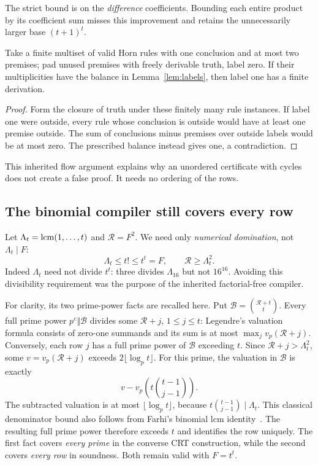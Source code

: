 The strict bound is on the \emph{difference} coefficients. Bounding
each entire product by its coefficient sum misses this improvement
and retains the unnecessarily larger base $(t+1)^t$.

\begin{lemma}
Take a finite multiset of valid Horn rules with one conclusion and at most
two premises; pad unused premises with freely derivable truth, label zero.
If their multiplicities have the balance in Lemma~\ref{lem:labels},
then label one has a finite derivation.
\end{lemma}
\begin{proof}
Form the closure of truth under these finitely many rule instances.
If label one were outside, every rule whose conclusion is outside would
have at least one premise outside. The sum of conclusions minus premises
over outside labels would be at most zero. The prescribed balance
instead gives one, a contradiction.
\end{proof}

This inherited flow argument explains why an unordered certificate with
cycles does not create a false proof. It needs no ordering of the rows.

\subsection{The binomial compiler still covers every row}

Let $\Lambda_t=\operatorname{lcm}(1,\ldots,t)$ and $\mathcal R=F^2$. We need only
\emph{numerical domination}, not $\Lambda_t\mid F$:
\[
 \Lambda_t\le t!\le t^t=F,\qquad \mathcal R\ge\Lambda_t^2.
\]
Indeed $\Lambda_t$ need not divide $t^t$: three divides $\Lambda_{16}$
but not $16^{16}$. Avoiding this divisibility requirement was the
purpose of the inherited factorial-free compiler.

For clarity, its two prime-power facts are recalled here. Put
$\mathcal B=\binom{\mathcal R+t}{t}$. Every full prime power
$p^e\Vert\mathcal B$ divides some $\mathcal R+j$, $1\le j\le t$:
Legendre's valuation formula consists of zero-one summands and its
sum is at most $\max_jv_p(\mathcal R+j)$. Conversely, each row $j$
has a full prime power of $\mathcal B$ exceeding $t$. Since
$\mathcal R+j>\Lambda_t^2$, some $v=v_p(\mathcal R+j)$ exceeds
$2\lfloor\log_p t\rfloor$. For this prime, the valuation in
$\mathcal B$ is exactly
\[
 v-v_p\!\left(t\binom{t-1}{j-1}\right).
\]
The subtracted valuation is at most $\lfloor\log_p t\rfloor$, because
$t\binom{t-1}{j-1}\mid\Lambda_t$. This classical denominator bound
also follows from Farhi's binomial lcm identity~\cite{farhi}.
The resulting full prime power therefore exceeds $t$ and identifies
the row uniquely. The first fact covers \emph{every prime} in the
converse CRT construction, while the second covers \emph{every row}
in soundness. Both remain valid with $F=t^t$.

